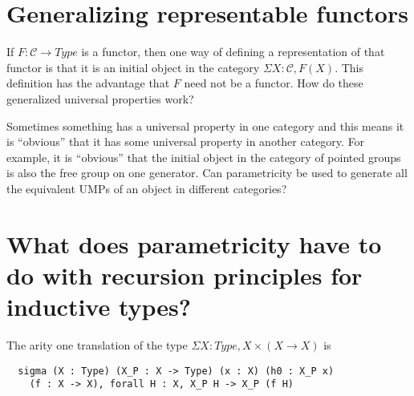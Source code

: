 \documentclass[12pt]{article} %
\theoremstyle{definition}
\theoremstyle{definition}
\theoremstyle{definition}
\theoremstyle{definition}
\begin{document}
\section{Generalizing representable functors}
If $F : \mathcal{C} \rightarrow Type$ is a functor, then one way of defining a representation
of that functor is that it is an initial object in the category $\Sigma X : \mathcal{C}, F(X)$.
This definition has the advantage that $F$ need not be a functor. How do these generalized 
universal properties work?

Sometimes something has a universal property in one category and this means it is ``obvious'' that 
it has some universal property in another category. For example, it is ``obvious'' that the initial
object in the category of pointed groups is also the free group on one generator. Can parametricity be used 
to generate all the equivalent UMPs of an object in different categories?




\section {What does parametricity have to do with recursion principles for inductive types?}

The arity one translation of the type $\Sigma X : Type, X \times (X \rightarrow X)$ is 
\begin{lstlisting}
  sigma (X : Type) (X_P : X -> Type) (x : X) (h0 : X_P x) 
    (f : X -> X), forall H : X, X_P H -> X_P (f H)
\end{lstlisting}






\end{document}
